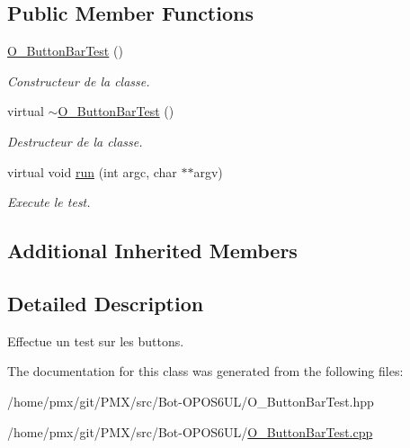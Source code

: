 \subsection*{Public Member Functions}
\begin{DoxyCompactItemize}
\item 
\mbox{\label{classO__ButtonBarTest_ad9cf9c23715a8e9788419dc7499a709c}} 
\hyperlink{classO__ButtonBarTest_ad9cf9c23715a8e9788419dc7499a709c}{O\+\_\+\+Button\+Bar\+Test} ()
\begin{DoxyCompactList}\small\item\em Constructeur de la classe. \end{DoxyCompactList}\item 
\mbox{\label{classO__ButtonBarTest_a1b6b49168a4794da4fae9828c1209f33}} 
virtual \hyperlink{classO__ButtonBarTest_a1b6b49168a4794da4fae9828c1209f33}{$\sim$\+O\+\_\+\+Button\+Bar\+Test} ()
\begin{DoxyCompactList}\small\item\em Destructeur de la classe. \end{DoxyCompactList}\item 
\mbox{\label{classO__ButtonBarTest_a444c3618a504b59d0236b4b530f463e1}} 
virtual void \hyperlink{classO__ButtonBarTest_a444c3618a504b59d0236b4b530f463e1}{run} (int argc, char $\ast$$\ast$argv)
\begin{DoxyCompactList}\small\item\em Execute le test. \end{DoxyCompactList}\end{DoxyCompactItemize}
\subsection*{Additional Inherited Members}


\subsection{Detailed Description}
Effectue un test sur les buttons. 

The documentation for this class was generated from the following files\+:\begin{DoxyCompactItemize}
\item 
/home/pmx/git/\+P\+M\+X/src/\+Bot-\/\+O\+P\+O\+S6\+U\+L/O\+\_\+\+Button\+Bar\+Test.\+hpp\item 
/home/pmx/git/\+P\+M\+X/src/\+Bot-\/\+O\+P\+O\+S6\+U\+L/\hyperlink{O__ButtonBarTest_8cpp}{O\+\_\+\+Button\+Bar\+Test.\+cpp}\end{DoxyCompactItemize}
